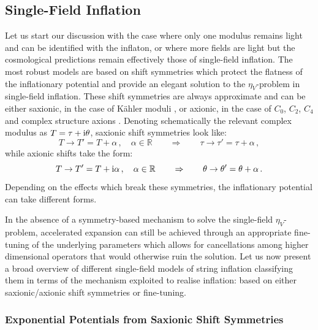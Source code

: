\subsection{Single-Field Inflation}

Let us start our discussion with the case where only one modulus remains light and can be identified with the inflaton, or where more fields are light but the cosmological predictions remain effectively those of single-field inflation. The most robust models are based on shift symmetries which protect the flatness of the inflationary potential and provide an elegant solution to the $\eta_V$-problem in single-field inflation. These shift symmetries are always approximate and can be either saxionic, in the case of K\"ahler moduli \cite{Burgess:2014tja,Burgess:2016owb}, or axionic, in the case of $C_0$, $C_2$, $C_4$ and complex structure axions \cite{Pajer:2013fsa}. Denoting schematically the relevant complex modulus as $T = \tau + {\rm i} \theta$, saxionic shift symmetries look like:
\begin{equation}
T \to T' = T + \alpha\, , \quad \alpha \in \mathbb{R}\qquad \Rightarrow \qquad \tau \to \tau' = \tau + \alpha\,,
\label{rhoshift}
\end{equation}
while axionic shifts take the form:
\begin{equation}
T \to T' = T+ {\rm i} \alpha\, , \quad\alpha \in \mathbb{R} \qquad \Rightarrow \qquad \theta \to \theta' = \theta + \alpha\,.
\label{axionshift}
\end{equation}
Depending on the effects which break these symmetries, the inflationary potential can take different forms. 

In the absence of a symmetry-based mechanism to solve the single-field $\eta_V$-problem, accelerated expansion can still be achieved through an appropriate fine-tuning of the underlying parameters which allows for cancellations among higher dimensional operators that would otherwise ruin the solution. Let us now present a broad overview of different single-field models of string inflation classifying them in terms of the mechanism exploited to realise inflation: based on either saxionic/axionic shift symmetries or fine-tuning.





\subsubsection{Exponential Potentials from Saxionic Shift Symmetries}

